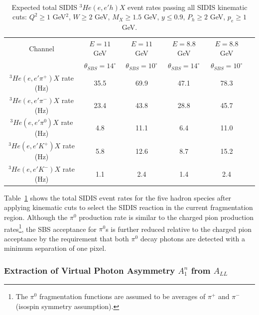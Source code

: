 \paragraph{}
\begin{table}[h]
  \caption{\label{RateTable} Expected total SIDIS $^3He(e,e'h)X$ event rates passing all SIDIS kinematic cuts: $Q^2 \ge 1$ GeV$^2$, $W \ge 2$ GeV, $M_X \ge 1.5$ GeV, $y \le 0.9$, $P_h \ge 2$ GeV, $p_e \ge 1$ GeV.}
  \begin{center}
    \begin{tabular}{cccccc}
      \hline \hline
      Channel & $E = 11$ GeV & $E = 11$ GeV & $E = 8.8$ GeV & $E=8.8$ GeV \\ 
      & $\theta_{SBS} = 14^\circ$ & $\theta_{SBS}=10^\circ$ & $\theta_{SBS} = 14^\circ$ & $\theta_{SBS} = 10^\circ$ \\ \hline 
      $^3He(e,e'\pi^+)X$ rate (Hz) & 35.5 & 69.9 & 47.1 & 78.3 \\ 
      $^3He(e,e'\pi^-)X$ rate (Hz) & 23.4 & 43.8 & 28.8 & 45.7 \\
      $^3He(e,e'\pi^0)X$ rate (Hz) & 4.8 & 11.1 & 6.4 & 11.0 \\
      $^3He(e,e'K^+)X$ rate (Hz) & 5.8 & 12.6 & 8.7 & 15.2 \\
      $^3He(e,e'K^-)X$ rate (Hz) & 1.1 & 2.4 & 1.4 & 2.4 \\ \hline \hline 
    \end{tabular}
  \end{center}
\end{table}
Table~\ref{RateTable} shows the total SIDIS event rates for the five hadron species after applying kinematic cuts to select the SIDIS reaction in the current fragmentation region. Although the $\pi^0$ production rate is similar to the charged pion production rates\footnote{The $\pi^0$ fragmentation functions are assumed to be averages of $\pi^+$ and $\pi^-$ (isospin symmetry assumption).}, the SBS acceptance for $\pi^0$s is further reduced relative to the charged pion acceptance by the requirement that both $\pi^0$ decay photons are detected with a minimum separation of one pixel.
\subsubsection{Extraction of Virtual Photon Asymmetry $A_1^n$ from $A_{LL}$}

